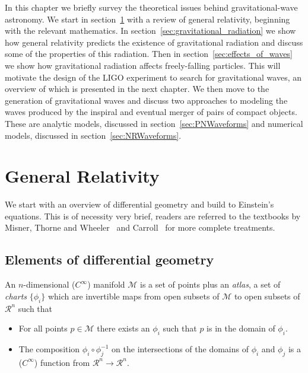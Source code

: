In this chapter we briefly survey the theoretical issues behind
gravitational-wave astronomy.  We start in
section~\ref{sec:general_relativity} with a review of general
relativity, beginning with the relevant mathematics.  In
section~\ref{sec:gravitational_radiation} we show how general
relativity predicts the existence of gravitational radiation and
discuss some of the properties of this radiation.  Then in
section~\ref{sec:effects_of_waves} we show how gravitational radiation
affects freely-falling particles.  This will motivate the design of
the LIGO experiment to search for gravitational waves, an overview of
which is presented in the next chapter.  We then move to the
generation of gravitational waves and discuss two approaches to
modeling the waves produced by the inspiral and eventual merger of
pairs of compact objects.  These are analytic models, discussed in
section~\ref{sec:PNWaveforms} and numerical models, discussed in
section~\ref{sec:NRWaveforms}.


\section{General Relativity}
\label{sec:general_relativity}

We start with an overview of differential geometry and build to
Einstein's equations.  This is of necessity very brief, readers are
referred to the textbooks by Misner, Thorne and Wheeler~\cite{MTW} and
Carroll~\cite{carrollTextbook} for more complete treatments.

\subsection{Elements of differential geometry}

An $n$-dimensional ($C^\infty$) manifold $\mathcal{M}$ is a set of
points plus an \emph{atlas}, a set of \emph{charts} $\{\phi_i\}$ which
are invertible maps from open subsets of $\mathcal{M}$ to open subsets
of $\mathcal{R}^n$ such that


\begin{itemize}
\item For all points $p \in \mathcal{M}$ there exists an $\phi_i$ 
such that $p$ is in the domain of $\phi_i$.
\item The composition $\phi_i \circ \phi_j^{-1}$ on the 
intersections of the domains of $\phi_i$ and $\phi_j$ is a
($C^\infty$) function from $\mathcal{R}^n \to \mathcal{R}^n$.
\end{itemize}

